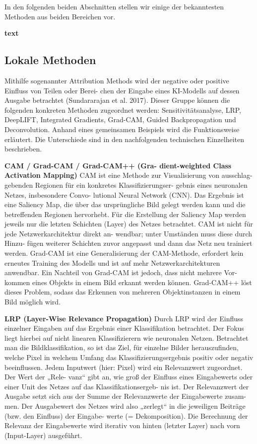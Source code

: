 \documentclass[11pt,a4paper]{article}
\numberwithin{equation}{section}
\begin{document}
In den folgenden beiden Abschnitten stellen wir einige der bekanntesten Methoden aus beiden Bereichen vor.


	\noindent \textbf{text}
	\subsection{Lokale Methoden}
	Mithilfe sogenannter Attribution Methods wird der
	negative oder positive Einfluss von Teilen oder Berei-
	chen der Eingabe eines KI-Modells auf dessen Ausgabe
	betrachtet (Sundararajan et al. 2017). Dieser Gruppe
	können die folgenden konkreten Methoden zugeordnet
	werden: Sensitivitätsanalyse, LRP, DeepLIFT, Integrated
	Gradients, Grad-CAM, Guided Backpropagation und
	Deconvolution. Anhand eines gemeinsamen Beispiels
	wird die Funktionsweise erläutert. Die Unterschiede
	sind in den nachfolgenden technischen Einzelheiten
	beschrieben.
	
	\noindent \textbf{CAM / Grad-CAM / Grad-CAM++ (Gra-
		dient-weighted Class Activation Mapping)}
	CAM ist eine Methode zur Visualisierung von ausschlag-
	gebenden Regionen für ein konkretes Klassifizierungser-
	gebnis eines neuronalen Netzes, insbesondere Convo-
	lutional Neural Network (CNN). Das Ergebnis ist eine
	Saliency Map, die über das ursprüngliche Bild gelegt
	werden kann und die betreffenden Regionen hervorhebt.
	Für die Erstellung der Saliency Map werden jeweils nur
	die letzten Schichten (Layer) des Netzes betrachtet.
	CAM ist nicht für jede Netzwerkarchitektur direkt an-
	wendbar; unter Umständen muss diese durch Hinzu-
	fügen weiterer Schichten zuvor angepasst und dann das
	Netz neu trainiert werden.
	Grad-CAM ist eine Generalisierung der CAM-Methode,
	erfordert kein erneutes Training des Modells und ist auf
	mehr Netzwerkarchitekturen anwendbar. Ein Nachteil
	von Grad-CAM ist jedoch, dass nicht mehrere Vor-
	kommen eines Objekts in einem Bild erkannt werden
	können. Grad-CAM++ löst dieses Problem, sodass das
	Erkennen von mehreren Objektinstanzen in einem Bild
	möglich wird.
	
	
	\noindent \textbf{LRP (Layer-Wise Relevance Propagation)}
	Durch LRP wird der Einfluss einzelner Eingaben auf das
		Ergebnis einer Klassifikation betrachtet. Der Fokus liegt
		hierbei auf nicht linearen Klassifizierern wie neuronalen
		Netzen. Betrachtet man die Bildklassifikation, so ist das
		Ziel, für einzelne Bilder herauszufinden, welche Pixel in
		welchem Umfang das Klassifizierungsergebnis positiv
		oder negativ beeinflussen. Jedem Inputwert (hier: Pixel)
		wird ein Relevanzwert zugeordnet. Der Wert der „Rele-
		vanz“ gibt an, wie groß der Einfluss eines Eingabewerts
		oder einer Unit des Netzes auf das Klassifikationsergeb-
		nis ist. Der Relevanzwert der Ausgabe setzt sich aus der
		Summe der Relevanzwerte der Eingabewerte zusam-
		men. Der Ausgabewert des Netzes wird also „zerlegt“ in
		die jeweiligen Beiträge (bzw. den Einfluss) der Eingabe-
		werte (= Dekomposition). Die Berechnung der Relevanz
		der Eingabewerte wird iterativ von hinten (letzter Layer)
		nach vorn (Input-Layer) ausgeführt.
	
\end{document}
